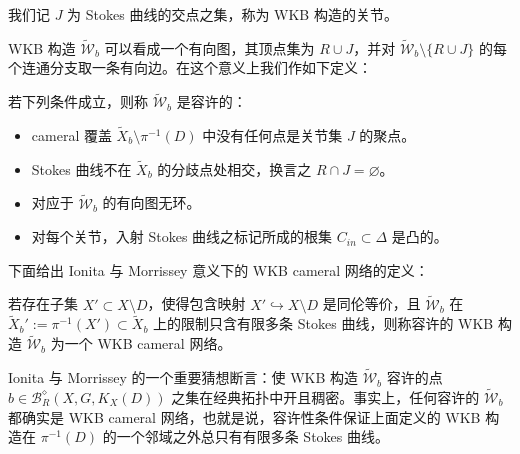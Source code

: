 我们记 $J$ 为 Stokes 曲线的交点之集，称为 WKB 构造的关节。



WKB 构造 $\widetilde{\mathcal{W}}_b$ 可以看成一个有向图，其顶点集为 $R\cup J$，并对 $\widetilde{\mathcal{W}}_b\setminus\{R\cup J\}$ 的每个连通分支取一条有向边。在这个意义上我们作如下定义：

\begin{definition}[25.9] 若下列条件成立，则称 $\widetilde{\mathcal{W}}_b$ 是容许的：
\begin{itemize}
  \item cameral 覆盖 $\tilde X_b\setminus\pi^{-1}(D)$ 中没有任何点是关节集 $J$ 的聚点。
  \item Stokes 曲线不在 $\tilde X_b$ 的分歧点处相交，换言之 $R\cap J=\varnothing$。
  \item 对应于 $\widetilde{\mathcal{W}}_b$ 的有向图无环。
  \item 对每个关节，入射 Stokes 曲线之标记所成的根集 $C_{in}\subset\Delta$ 是凸的。
\end{itemize}
\end{definition}

下面给出 Ionita 与 Morrissey 意义下的 WKB cameral 网络的定义：

\begin{definition}[25.10（{{{{{[214]}}}}, {{{{[274]}}}}, {{{{[215]}}}}}）] 若存在子集 $X'\subset X\setminus D$，使得包含映射 $X'\hookrightarrow X\setminus D$ 是同伦等价，且 $\widetilde{\mathcal{W}}_b$ 在 $\tilde X_b':=\pi^{-1}(X')\subset\tilde X_b$ 上的限制只含有限多条 Stokes 曲线，则称容许的 WKB 构造 $\widetilde{\mathcal{W}}_b$ 为一个 WKB cameral 网络。\end{definition}

Ionita 与 Morrissey 的一个重要猜想断言：使 WKB 构造 $\widetilde{\mathcal{W}}_b$ 容许的点 $b\in\mathcal{B}_R^{\diamond}(X,G,K_X(D))$ 之集在经典拓扑中开且稠密。事实上，任何容许的 $\widetilde{\mathcal{W}}_b$ 都确实是 WKB cameral 网络，也就是说，容许性条件保证上面定义的 WKB 构造在 $\pi^{-1}(D)$ 的一个邻域之外总只有有限多条 Stokes 曲线。

